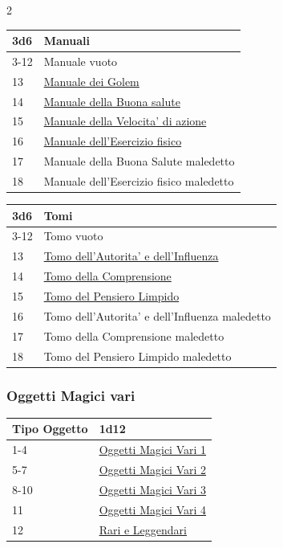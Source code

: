 \begin{multicols}{2}
{{\small\noindent\begin{tabularx}{\linewidth}{ll}
	\toprule
\rowcolor{gray!20}\textbf{3d6} & \textbf{Manuali}\\
\toprule
3-12 & Manuale vuoto\\
\rowcolor{gray!20}13 & \hyperlink{Manuale dei Golem}{Manuale dei Golem}\\
14 & \hyperlink{Manuale della Buona salute}{Manuale della Buona salute}\\
\rowcolor{gray!20}15 & \hyperlink{Manuale della Velocita' di azione}{Manuale della Velocita' di azione}\\
16 & \hyperlink{Manuale dell'Esercizio fisico}{Manuale dell'Esercizio fisico}\\
\rowcolor{gray!20}17 & Manuale della Buona Salute maledetto\\
18 & Manuale dell'Esercizio fisico maledetto
\end{tabularx}}

\medskip\hypertarget{Tomi}{}

{\small\begin{tabularx}{\linewidth}{ll}
		\toprule
\rowcolor{gray!20}\textbf{3d6} & \textbf{Tomi}\\
\toprule
3-12 & Tomo vuoto\\
\rowcolor{gray!20}13 & \hyperlink{Tomo dell'Autorita' e dell'Influenza}{Tomo dell'Autorita' e dell'Influenza}\\
14 & \hyperlink{Tomo della Comprensione}{Tomo della Comprensione}\\
\rowcolor{gray!20}15 & \hyperlink{Tomo del Pensiero Limpido}{Tomo del Pensiero Limpido}\\
16 & Tomo dell'Autorita' e dell'Influenza maledetto\\
\rowcolor{gray!20}17 & Tomo della Comprensione maledetto\\
18 & Tomo del Pensiero Limpido maledetto
\end{tabularx}}

\subsubsection{Oggetti Magici vari}\hypertarget{oggettimagicivari}{}\label{oggettimagicivari}

{\small\begin{tabularx}{\linewidth}{ll}
		\toprule
\rowcolor{gray!20}\textbf{Tipo Oggetto} & \textbf{1d12}\\
\toprule
1-4 & \hyperlink{Oggetti Magici Vari 1}{Oggetti Magici Vari 1}\\
\rowcolor{gray!20}5-7 & \hyperlink{Oggetti Magici Vari 2}{Oggetti Magici Vari 2}\\
8-10&\hyperlink{Oggetti Magici Vari 3}{Oggetti Magici Vari 3}\\
\rowcolor{gray!20}11  &\hyperlink{Oggetti Magici Vari 4}{Oggetti Magici Vari 4}\\
12  &\hyperlink{Rari e Leggendari}{Rari e Leggendari}
\end{tabularx}}

}
\end{multicols}
